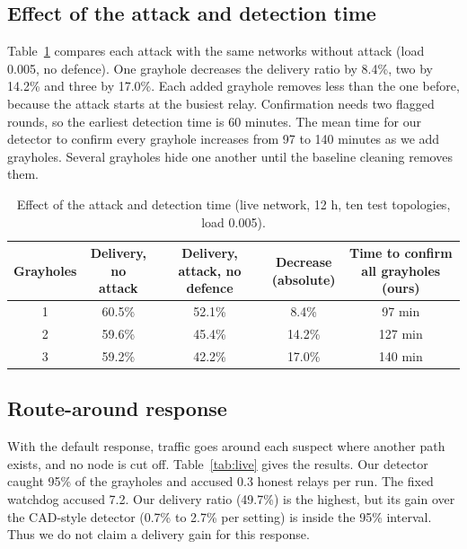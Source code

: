 \documentclass[11pt]{article}
\begin{document}
\subsection{Effect of the attack and detection time}\label{sec:res-attack}
\noindent
Table~\ref{tab:attack} compares each attack with the same networks without attack (load 0.005, no defence).
One grayhole decreases the delivery ratio by 8.4\%, two by 14.2\% and three by 17.0\%.
Each added grayhole removes less than the one before, because the attack starts at the busiest relay.
Confirmation needs two flagged rounds, so the earliest detection time is 60 minutes.
The mean time for our detector to confirm every grayhole increases from 97 to 140 minutes as we add grayholes.
Several grayholes hide one another until the baseline cleaning removes them.

\begin{table}[htbp]
\centering\small
\caption{Effect of the attack and detection time (live network, 12 h, ten test topologies, load 0.005).}\label{tab:attack}
\begin{tabular}{c c c c c}
\toprule
Grayholes & \shortstack{Delivery,\\no attack} & \shortstack{Delivery,\\attack, no defence} & \shortstack{Decrease\\(absolute)} & \shortstack{Time to confirm\\all grayholes (ours)} \\
\midrule
1 & 60.5\% & 52.1\% & 8.4\% & 97 min \\
2 & 59.6\% & 45.4\% & 14.2\% & 127 min \\
3 & 59.2\% & 42.2\% & 17.0\% & 140 min \\
\bottomrule
\end{tabular}
\end{table}

\subsection{Route-around response}\label{sec:res-route}
\noindent
With the default response, traffic goes around each suspect where another path exists, and no node is cut off.
Table~\ref{tab:live} gives the results.
Our detector caught 95\% of the grayholes and accused 0.3 honest relays per run.
The fixed watchdog accused 7.2.
Our delivery ratio (49.7\%) is the highest, but its gain over the CAD-style detector (0.7\% to 2.7\% per setting) is inside the 95\% interval.
Thus we do not claim a delivery gain for this response.
\end{document}
